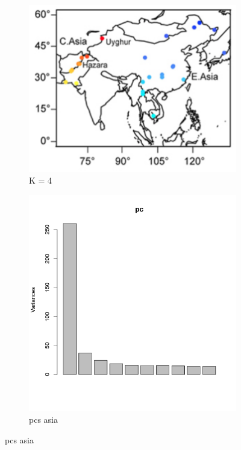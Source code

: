 \documentclass[a4paper, 11pt]{article}
\begin{document}
\begin{figure}
\centering
\begin{subfigure}
\centering
\includegraphics[scale=0.35]{asia_pop}
\caption{K = 4}
\end{subfigure}
\begin{subfigure}
\centering
\includegraphics[scale=0.5]{pc_asia}
\caption{pcs asia}
\end{subfigure}
\end{figure}
\end{document}

